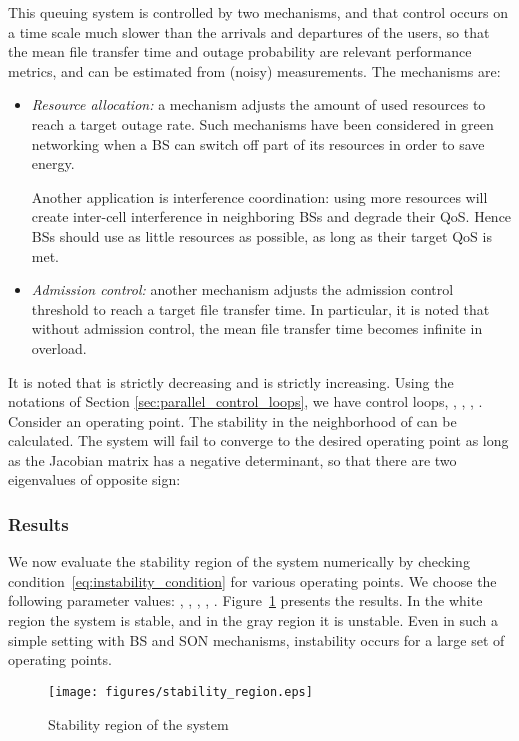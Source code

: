 \documentclass[10pt,conference,letterpaper]{IEEEtran}
\begin{document}
 This queuing system is controlled by two mechanisms, and that control occurs on a time scale much slower than the arrivals and departures of the users, so that the mean file transfer time and outage probability are relevant performance metrics, and can be estimated from (noisy) measurements. The mechanisms are:
\begin{itemize}
	\item \emph{Resource allocation:} a mechanism adjusts the amount of used resources to reach a target outage rate. Such mechanisms have been considered in green networking when a \ac{BS} can switch off part of its resources in order to save energy. 
		
	Another application is interference coordination: using more resources will create inter-cell interference in neighboring \acp{BS} and degrade their \ac{QoS}. Hence \acp{BS} should use as little resources as possible, as long as their target \ac{QoS} is met.
	\item \emph{Admission control: } another mechanism adjusts the admission control threshold to reach a target file transfer time. In particular, it is noted that without admission control, the mean file transfer time becomes infinite in overload.
\end{itemize}
It is noted that  is strictly decreasing and \newline  is strictly increasing. Using the notations of Section \ref{sec:parallel_control_loops}, we have  control loops, , , , . Consider  an operating point. The stability in the neighborhood of  can be calculated. The system will fail to converge to the desired operating point as long as the Jacobian matrix has a negative determinant, so that there are two eigenvalues of opposite sign:
	
\subsubsection{Results}
	We now evaluate the stability region of the system numerically by checking condition~\eqref{eq:instability_condition} for various operating points. We choose the following parameter values: , , , , . Figure~\ref{fig:stability_region} presents the results. In the white region the system is stable, and in the gray region it is unstable. Even in such a simple setting with  \ac{BS} and  \ac{SON} mechanisms, instability occurs for a large set of operating points.
	\begin{figure}[htbp]
		\begin{center}
			\texttt{[image: figures/stability\_region.eps]}
		\end{center}
		\caption{Stability region of the system}
		\label{fig:stability_region}
	\end{figure}
\end{document}
